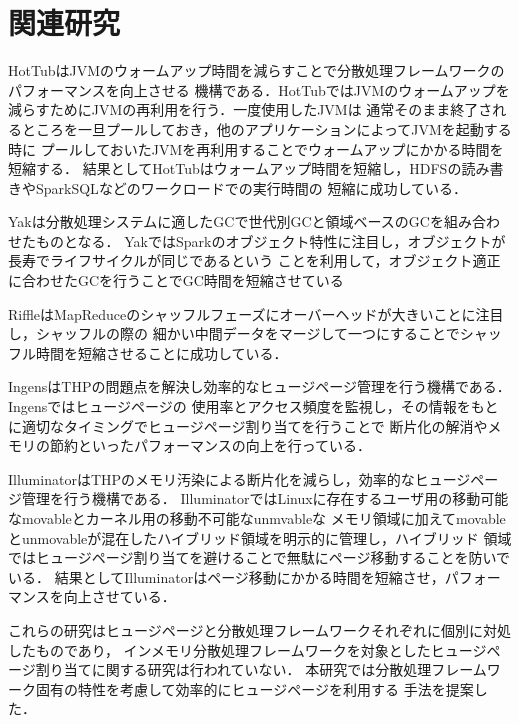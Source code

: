 \section{関連研究}
HotTub\cite{lion2016don}はJVMのウォームアップ時間を減らすことで分散処理フレームワークのパフォーマンスを向上させる
機構である．HotTubではJVMのウォームアップを減らすためにJVMの再利用を行う．一度使用したJVMは
通常そのまま終了されるところを一旦プールしておき，他のアプリケーションによってJVMを起動する時に
プールしておいたJVMを再利用することでウォームアップにかかる時間を短縮する．
結果としてHotTubはウォームアップ時間を短縮し，HDFS\cite{shvachko2010hadoop}の読み書きやSparkSQL\cite{armbrust2015spark}などのワークロードでの実行時間の
短縮に成功している．

Yak\cite{nguyen2016yak}は分散処理システムに適したGCで世代別GCと領域ベースのGCを組み合わせたものとなる．
YakではSparkのオブジェクト特性に注目し，オブジェクトが長寿でライフサイクルが同じであるという
ことを利用して，オブジェクト適正に合わせたGCを行うことでGC時間を短縮させている

Riffle\cite{zhang2018riffle}はMapReduceのシャッフルフェーズにオーバーヘッドが大きいことに注目し，シャッフルの際の
細かい中間データをマージして一つにすることでシャッフル時間を短縮させることに成功している．

Ingens\cite{kwon2016coordinated}はTHPの問題点を解決し効率的なヒュージページ管理を行う機構である．Ingensではヒュージページの
使用率とアクセス頻度を監視し，その情報をもとに適切なタイミングでヒュージページ割り当てを行うことで
断片化の解消やメモリの節約といったパフォーマンスの向上を行っている．

Illuminator\cite{panwar2018making}はTHPのメモリ汚染による断片化を減らし，効率的なヒュージページ管理を行う機構である．
IlluminatorではLinuxに存在するユーザ用の移動可能なmovableとカーネル用の移動不可能なunmvableな
メモリ領域に加えてmovableとunmovableが混在したハイブリッド領域を明示的に管理し，ハイブリッド
領域ではヒュージページ割り当てを避けることで無駄にページ移動することを防いでいる．
結果としてIlluminatorはページ移動にかかる時間を短縮させ，パフォーマンスを向上させている．

これらの研究はヒュージページと分散処理フレームワークそれぞれに個別に対処したものであり，
インメモリ分散処理フレームワークを対象としたヒュージページ割り当てに関する研究は行われていない．
本研究では分散処理フレームワーク固有の特性を考慮して効率的にヒュージページを利用する
手法を提案した．
